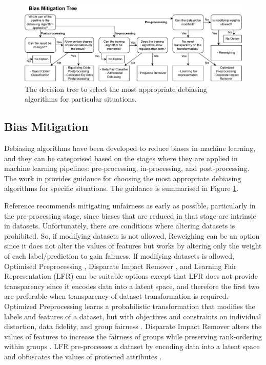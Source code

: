 \documentclass[sigconf]{acmart}
\begin{document}
	
	\begin{figure}
		\includegraphics[width=\linewidth]{figures/wizard-debiasing}
		\caption{The decision tree to select the most appropriate debiasing algorithms for particular situations.}
		\label{fig:wizard-debiasing}
	\end{figure}
	
	\subsection{Bias Mitigation}
	\label{sec:bias_mitigation}
	
	Debiasing algorithms have been developed to reduce biases in machine learning, and they can be categorised based on the stages where they are applied in machine learning pipelines: pre-processing, in-processing, and post-processing. The work in  \cite{mahoney2020ai,ibmaif3602022guidance} provides guidance for choosing the most appropriate debiasing algorithms for specific situations. The guidance is summarised in Figure \ref{fig:wizard-debiasing}.
	
	Reference \cite{mahoney2020ai} recommends mitigating unfairness as early as possible, particularly in the pre-processing stage, since biases that are reduced in that stage are intrinsic in datasets. Unfortunately, there are conditions where altering datasets is prohibited. So, if modifying datasets is not allowed, Reweighing \cite{kamiran2011reweighing} can be an option since it does not alter the values of features but works by altering only the weight of each label/prediction to gain fairness. If modifying datasets is allowed, Optimised Preprocessing \cite{calmon2017optimized}, Disparate Impact Remover \cite{feldman2015disparate}, and Learning Fair Representation (LFR) \cite{zemel2013lfr} can be suitable options except that LFR does not provide transparency since it encodes data into a latent space, and therefore the first two are preferable when transparency of dataset transformation is required.
	Optimized Preprocessing learns a probabilistic transformation that modifies the labels and features of a dataset, but with objectives and constraints on individual distortion, data fidelity, and group fairness \cite{mahoney2020ai,calmon2017optimized}.
	Disparate Impact Remover alters the values of features to increase the fairness of groups while preserving rank-ordering within groups \cite{mahoney2020ai,feldman2015disparate}.
	LFR pre-processes a dataset by encoding data into a latent space and obfuscates the values of protected attributes \cite{mahoney2020ai,zemel2013lfr}.
	
\end{document}
